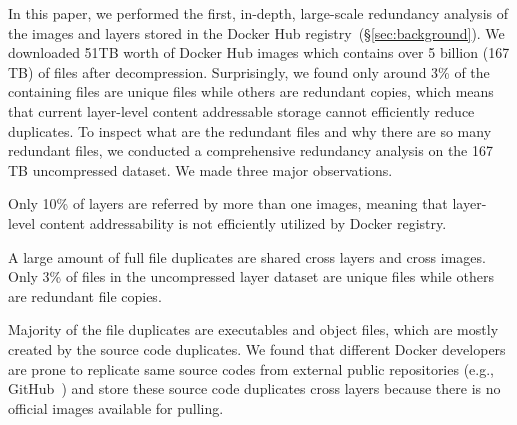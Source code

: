 In this paper, we performed the first, in-depth, large-scale redundancy
analysis of the images and layers stored in the Docker Hub
registry~(\S\ref{sec:background}).
%
We downloaded 51TB worth of Docker Hub images which contains over 5 billion (167 TB)
of files after decompression.
%
%
%
%
Surprisingly, we found only around 3\% of the containing files are unique files
while others are redundant copies, which means that current layer-level content
addressable storage cannot efficiently reduce duplicates.
%
To inspect what are the redundant files and why there are so many redundant
files, we conducted a comprehensive redundancy analysis on the 167 TB
uncompressed dataset.
%
We made three major observations.
%
\begin{compactitemize}
%
\item Only 10\% of layers are referred by more than one images, 
meaning that layer-level content addressability is not efficiently utilized by Docker registry.
%
\item A large amount of full file duplicates are shared cross layers and cross images. 
Only 3\% of files in the uncompressed layer dataset are unique files while others are redundant file copies.
%
\item Majority of the file duplicates are executables and object files, which are mostly created by the source code duplicates.
%
We found that different Docker developers are prone to replicate same source codes from external public repositories (e.g., GitHub~\cite{github}) and store these source code duplicates cross layers because there is no official images available for pulling.  

\end{compactitemize}

